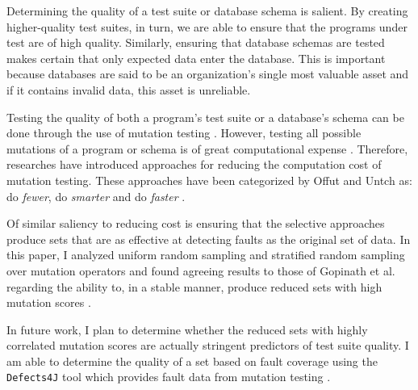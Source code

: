 \documentclass[conference]{IEEEtran}
\begin{document}
Determining the quality of a test suite or database schema is salient.
By creating higher-quality test suites, in turn, we are able to ensure that the programs
under test are of high quality. Similarly, ensuring that database schemas are tested makes certain
that only expected data enter the database. This is important because databases are said to be an organization's single most
valuable asset \cite{silberschatz1997database} and if it contains invalid data, this asset is unreliable.

Testing the quality of both a program's test suite or a database's schema can be done
through the use of mutation testing \cite{gopinath2015empirical, mcminn2015effectiveness}. However,
testing all possible mutations of a program or schema is of great computational expense \cite{offutt1993experimental}.
Therefore, researches have introduced approaches for reducing the computation cost
of mutation testing. These approaches have been categorized by
Offut and Untch as: do \textit{fewer}, do \textit{smarter} and do \textit{faster} \cite{offutt1993experimental}.

Of similar saliency to reducing cost is ensuring that the selective approaches
produce sets that are as effective at detecting faults as the original
set of data. In this paper, I analyzed uniform random sampling and stratified random sampling
over mutation operators and found agreeing results to those of Gopinath et al. regarding the
ability to, in a stable manner, produce reduced sets with high mutation scores \cite{gopinath2015empirical}.


In future work, I plan to determine whether the reduced sets with highly correlated mutation scores
are actually stringent predictors of test suite quality. I am able to determine the quality of
a set based on fault coverage using the \texttt{Defects4J} tool which provides fault data from mutation
testing \cite{just2014defects4j}.
\end{document}
